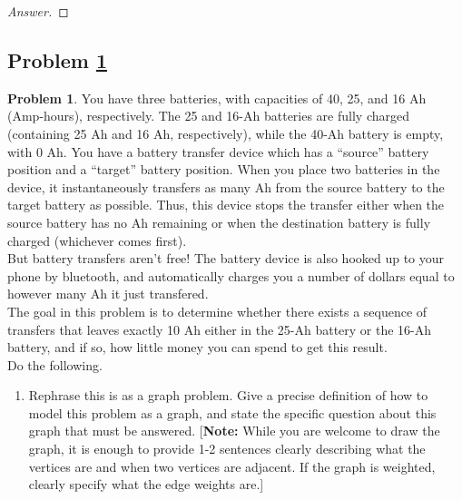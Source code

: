 \documentclass[11pt]{article}
\theoremstyle{definition}
\theoremstyle{definition}
\newtheorem{required}{Problem}
\theoremstyle{definition}
\begin{document}
\begin{proof}[Answer]
\end{proof}





\newpage
\subsection{Problem \ref{Dijkstra2}} 
\begin{required} \label{Dijkstra2}
You have three batteries, with capacities of 40, 25, and 16 Ah (Amp-hours), respectively. The 25 and 16-Ah batteries are fully charged (containing 25 Ah and 16 Ah, respectively), while the 40-Ah battery is empty, with 0 Ah. You have a battery transfer device which has a ``source'' battery position and a ``target'' battery position. When you place two batteries in the device, it instantaneously transfers as many Ah from the source battery to the target battery as possible. Thus, this device stops the transfer either when the source battery has no Ah remaining or when the destination battery is fully charged (whichever comes first).  \\

\noindent But battery transfers aren't free! The battery device is also hooked up to your phone by bluetooth, and automatically charges you a number of dollars equal to however many Ah it just transfered.  \\
	
\noindent The goal in this problem is to determine whether there exists a sequence of transfers that leaves exactly 10 Ah either in the 25-Ah battery or the 16-Ah battery, and if so, how little money you can spend to get this result. \\

\noindent Do the following.
\begin{enumerate}[label=(\alph*)]
\subsubsection{Problem 6\ref{Dijkstra2a}}
\item \label{Dijkstra2a} Rephrase this is as a graph problem. Give a precise definition of how to model this problem as a graph, and state the specific question about this graph that must be answered. [\textbf{Note:} While you are welcome to draw the graph, it is enough to provide 1-2 sentences clearly describing what the vertices are and when two vertices are adjacent. If the graph is weighted, clearly specify what the edge weights are.]


\end{enumerate}
\end{required}
\end{document}
